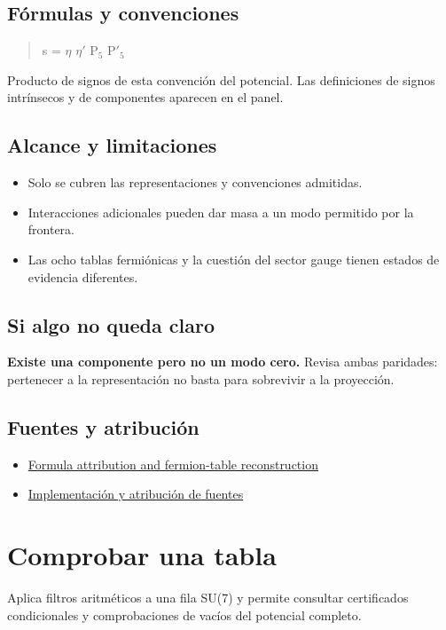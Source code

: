 \documentclass[11pt,a4paper]{article}
\begin{document}
\subsection*{Fórmulas y convenciones}
\begin{quote}s = \ensuremath{\eta} \ensuremath{\eta}\ensuremath{\prime} P\ensuremath{{}_{5}} P\ensuremath{\prime}\ensuremath{{}_{5}}\end{quote}
Producto de signos de esta convención del potencial. Las definiciones de signos intrínsecos y de componentes aparecen en el panel.

\subsection*{Alcance y limitaciones}
\begin{itemize}
\item Solo se cubren las representaciones y convenciones admitidas.
\item Interacciones adicionales pueden dar masa a un modo permitido por la frontera.
\item Las ocho tablas fermiónicas y la cuestión del sector gauge tienen estados de evidencia diferentes.
\end{itemize}
\subsection*{Si algo no queda claro}
\textbf{Existe una componente pero no un modo cero.} Revisa ambas paridades: pertenecer a la representación no basta para sobrevivir a la proyección.

\subsection*{Fuentes y atribución}
\begin{itemize}
\item \href{https://karlesmarin.github.io/ghu-explorer/docs/su7-certification.html}{Formula attribution and fermion-table reconstruction}
\item \href{https://github.com/karlesmarin/ghu-lab/blob/main/src/sections/multiplets_section.js}{Implementación y atribución de fuentes}
\end{itemize}
\section{Comprobar una tabla}
Aplica filtros aritméticos a una fila SU(7) y permite consultar certificados condicionales y comprobaciones de vacíos del potencial completo.
\end{document}
